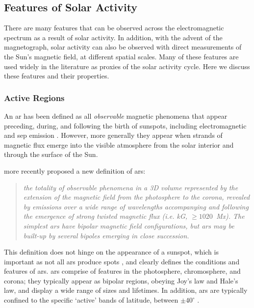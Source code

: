 

\subsection{Features of Solar Activity}

There are many features that can be observed across the electromagnetic spectrum as a result of solar activity. In addition, with the advent of the magnetograph, solar activity can also be observed with direct measurements of the Sun's magnetic field, at different spatial scales. Many of these features are used widely in the literature as proxies of the solar activity cycle. Here we discuss these features and their properties.


\subsubsection*{Active Regions}

An \gls{ar} has been defined as all \textit{observable} magnetic phenomena that appear preceding, during, and following the birth of sunspots, including electromagnetic and \gls{sep} emission \citep{kiepenheuer_structure_1968}. However, more generally they appear when strands of magnetic flux emerge into the visible atmosphere from the solar interior and through the surface of the Sun. 

\citet{van_driel-gesztelyi_evolution_2015} more recently proposed a new definition of \glspl{ar}:

\begin{quote}
	\textit{the totality of observable phenomena in a 3D volume represented by the extension of the magnetic field from the photosphere to the corona, revealed by emissions over a wide range of wavelengths accompanying and following the emergence of strong twisted magnetic flux (i.e. kG, $\geq1020$~Mx). The simplest \glspl{ar} have bipolar magnetic field configurations, but \glspl{ar} may be built-up by several bipoles emerging in close succession.}
\end{quote}

This definition does not hinge on the appearance of a sunspot, which is important as not all \glspl{ar} produce spots \citep{van_driel-gesztelyi_evolution_2015}, and clearly defines the conditions and features of \glspl{ar}. \glspl{ar} comprise of features in the photosphere, chromosphere, and corona; they typically appear as bipolar regions, obeying Joy's law and Hale's law, and display a wide range of sizes and lifetimes. In addition, \glspl{ar} are typically confined to the specific `active' bands of latitude, between $\pm40^{\circ}$ \citep{harvey_solar_2001}.

